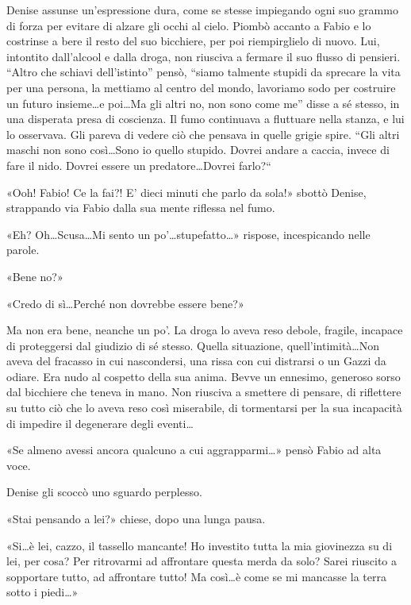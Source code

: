 Denise assunse un'espressione dura, come se stesse impiegando ogni suo grammo di forza per evitare di alzare gli occhi al cielo. Piombò accanto a Fabio e lo costrinse a bere il resto del suo bicchiere, per poi riempirglielo di nuovo. Lui, intontito dall'alcool e dalla droga, non riusciva a fermare il suo flusso di pensieri. ``Altro che schiavi dell'istinto'' pensò, ``siamo talmente stupidi da sprecare la vita per una persona, la mettiamo al centro del mondo, lavoriamo sodo per costruire un futuro insieme\ldots e poi\ldots Ma gli altri no, non sono come me'' disse a sé stesso, in una disperata presa di coscienza. Il fumo continuava a fluttuare nella stanza, e lui lo osservava. Gli pareva di vedere ciò che pensava in quelle grigie spire. ``Gli altri maschi non sono così\ldots Sono io quello stupido. Dovrei andare a caccia, invece di fare il nido. Dovrei essere un predatore\ldots Dovrei farlo?``

«Ooh! Fabio! Ce la fai?! E' dieci minuti che parlo da sola!» sbottò Denise, strappando via Fabio dalla sua mente riflessa nel fumo.

«Eh? Oh\ldots Scusa\ldots Mi sento un po'\ldots stupefatto\ldots» rispose, incespicando nelle parole.

«Bene no?»

«Credo di sì\ldots Perché non dovrebbe essere bene?»

Ma non era bene, neanche un po'. La droga lo aveva reso debole, fragile, incapace di proteggersi dal giudizio di sé stesso. Quella situazione, quell'intimità\ldots Non aveva del fracasso in cui nascondersi, una rissa con cui distrarsi o un Gazzi da odiare. Era nudo al cospetto della sua anima. Bevve un ennesimo, generoso sorso dal bicchiere che teneva in mano. Non riusciva a smettere di pensare, di riflettere su tutto ciò che lo aveva reso così miserabile, di tormentarsi per la sua incapacità di impedire il degenerare degli eventi\ldots

«Se almeno avessi ancora qualcuno a cui aggrapparmi\ldots» pensò Fabio ad alta voce.

Denise gli scoccò uno sguardo perplesso.

«Stai pensando a lei?» chiese, dopo una lunga pausa.

«Si\ldots è lei, cazzo, il tassello mancante! Ho investito tutta la mia giovinezza su di lei, per cosa? Per ritrovarmi ad affrontare questa merda da solo? Sarei riuscito a sopportare tutto, ad affrontare tutto! Ma così\ldots è come se mi mancasse la terra sotto i piedi\ldots»

